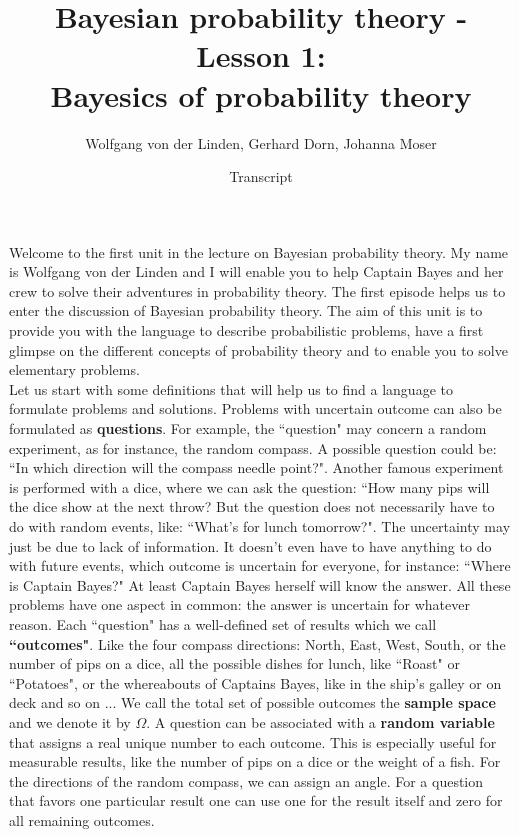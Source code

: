 \documentclass[12pt, a4paper]{scrartcl}
\title{Bayesian probability theory - Lesson 1:\\
Bayesics of probability theory}
\author{Wolfgang von der Linden, Gerhard Dorn, Johanna Moser}
\date{Transcript}
\begin{document}
\setlength{\parindent}{0pt}
\maketitle
\onehalfspacing

Welcome to the first unit in the lecture on Bayesian probability theory. My name is Wolfgang von der Linden and I will enable you to help Captain Bayes and her crew to solve their adventures in probability theory.
The first episode helps us to enter the discussion of Bayesian probability theory.
The aim of this unit is to provide you with the language to describe probabilistic problems, have a first glimpse on the different concepts of probability theory and to enable you to solve elementary problems.\\

Let us start with some definitions that will help us to find a language to formulate problems and solutions.
Problems with uncertain outcome can also be formulated as \textbf{questions}. For example, the ``question" may concern a random experiment, as for instance, the random compass. A possible question could be: ``In which direction will the compass needle point?". 
Another famous experiment is performed with a dice, where we can ask the question: ``How many pips will the dice show at the next throw? 
But the question does not necessarily have to do with random events, like: ``What’s for lunch tomorrow?". The uncertainty may just be due to lack of information. It doesn’t even have to have anything to do with future events, which outcome is uncertain for everyone, for instance: ``Where is Captain Bayes?" At least Captain Bayes herself will know the answer. All these problems have one aspect in common: the answer is uncertain for whatever reason.
Each ``question" has a well-defined set of results which we call \textbf{``outcomes"}. Like the four compass directions: North, East, West, South, or the number of pips on a dice, all the possible dishes for lunch, like ``Roast" or ``Potatoes", or the whereabouts of Captains Bayes, like in the ship’s galley or on deck and so on ...
We call the total set of possible outcomes the \textbf{sample space} and we denote it by \textbf{$\Omega$}. A question can be associated with a \textbf{random variable} that assigns a real unique number to each outcome. This is especially useful for measurable results, like the number of pips on a dice or the weight of a fish. 
For the directions of the random compass, we can assign an angle. For a question that favors one particular result one can use one for the result itself and zero for all remaining outcomes.\\
\end{document}
